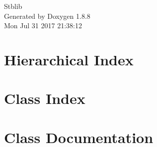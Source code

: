 \documentclass[twoside]{book}
\newcommand{\+}{\discretionary{\mbox{\scriptsize$\hookleftarrow$}}{}{}}
\newcommand{\clearemptydoublepage}{%
  \newpage{\pagestyle{empty}\cleardoublepage}%
}
\begin{document}
\hypersetup{pageanchor=false,
             bookmarks=true,
             bookmarksnumbered=true,
             pdfencoding=unicode
            }
\begin{titlepage}
\vspace*{7cm}
\begin{center}%
{\Large Stblib }\\
\vspace*{1cm}
{\large Generated by Doxygen 1.8.8}\\
\vspace*{0.5cm}
{\small Mon Jul 31 2017 21:38:12}\\
\end{center}
\end{titlepage}
\clearemptydoublepage
\tableofcontents
\clearemptydoublepage
{}
\hypersetup{pageanchor=true}

\chapter{Hierarchical Index}

\chapter{Class Index}

\chapter{Class Documentation}





































\newpage
{}
{}
\printindex
\end{document}

